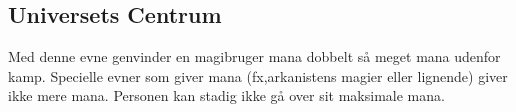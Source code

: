 \subsection*{Universets Centrum}

Med denne evne genvinder en magibruger mana dobbelt så meget mana udenfor kamp. Specielle evner som giver mana (fx,arkanistens magier eller lignende) giver ikke mere mana. Personen kan stadig ikke gå over sit maksimale mana.